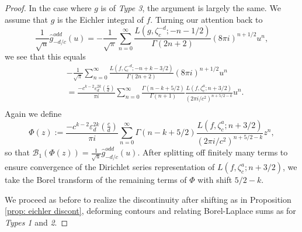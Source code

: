 \documentclass[10pt,a4paper]{amsart}
\begin{document}
\begin{proof}
In the case where $g$ is of \emph{Type 3}, the argument is largely the same. We assume that $g$ is the Eichler integral of $f$. Turning our attention back to 
\[\frac{1}{\sqrt{u}}\widehat{g}_{-d/c}^{odd}(u) = -\frac{1}{\sqrt{\pi }} \sum_{n=0}^\infty \frac{ L(g, \zeta_c^{-d};-n-1/2)}{\Gamma(2n+2)}(8\pi i)^{n+1/2}u^{n},
\]
we see that this equals 
\begin{align*}
	&-\frac{1}{\sqrt{\pi}}\sum_{n=0}^\infty \frac{L(f, \zeta_c^{-d};-n+k-3/2)}{\Gamma(2n+2)}(8\pi i)^{n+1/2} u^{n} \\
	&= \frac{- c^{k-2} \varepsilon_d^{2k} \left( \frac{c}{d}\right)}{\pi i}\sum_{n=0}^\infty  \frac{\Gamma(n-k+5/2)}{\Gamma(n+1)} \frac{L(f, \zeta_c^{a}; n+3/2)}{(2\pi i/c^2)^{n+5/2-k}} u^n.\\
\end{align*}
Again we define 
\[\Phi(z) := \frac{- c^{k-2} \varepsilon_d^{2k} \left( \frac{c}{d}\right)}{\pi i}\sum_{n=0}^\infty \Gamma(n-k+5/2) \frac{L(f, \zeta_c^{a}; n+3/2)}{(2\pi i/c^2)^{n+5/2-k}} z^n,
\]
so that $\mathcal{B}_1(\Phi(z)) =\frac{1}{\sqrt{u}}\widehat{g}_{-d/c}^{odd}(u)$. After splitting off finitely many terms to ensure convergence of the Dirichlet series representation of $L(f, \zeta_c^{a}; n+3/2)$, we take the Borel transform of the remaining terms of $\Phi$ with shift $5/2-k$. 

We proceed as before to realize the discontinuity after shifting as in Proposition \ref{prop: eichler discont}, deforming contours and relating Borel-Laplace sums as for \emph{Types 1} and \emph{2}. \end{proof}
\end{document}
